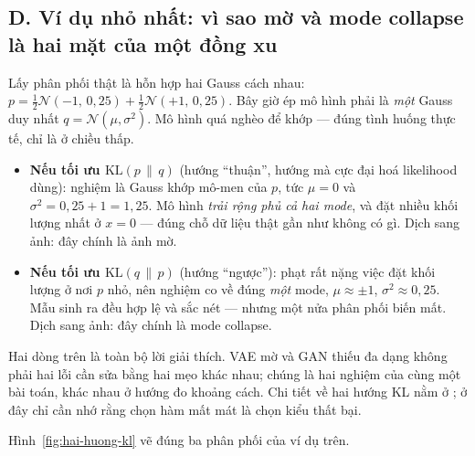 \documentclass[../../../deep_learning.tex]{subfiles}
\begin{document}
\subsection{D. Ví dụ nhỏ nhất: vì sao mờ và mode collapse là hai mặt của một đồng xu}
Lấy phân phối thật là hỗn hợp hai Gauss cách nhau: \(p = \tfrac12\mathcal{N}(-1,\,0{,}25) + \tfrac12\mathcal{N}(+1,\,0{,}25)\). Bây giờ ép mô hình phải là \emph{một} Gauss duy nhất \(q=\mathcal{N}(\mu,\sigma^{2})\). Mô hình quá nghèo để khớp --- đúng tình huống thực tế, chỉ là ở chiều thấp.

\begin{itemize}
\item \textbf{Nếu tối ưu \(\mathrm{KL}(p\,\|\,q)\)} (hướng ``thuận'', hướng mà cực đại hoá likelihood dùng): nghiệm là Gauss khớp mô-men của \(p\), tức \(\mu = 0\) và \(\sigma^{2} = 0{,}25 + 1 = 1{,}25\). Mô hình \emph{trải rộng phủ cả hai mode}, và đặt nhiều khối lượng nhất ở \(x=0\) --- đúng chỗ dữ liệu thật gần như không có gì. Dịch sang ảnh: đây chính là ảnh mờ.
\item \textbf{Nếu tối ưu \(\mathrm{KL}(q\,\|\,p)\)} (hướng ``ngược''): phạt rất nặng việc đặt khối lượng ở nơi \(p\) nhỏ, nên nghiệm co về đúng \emph{một} mode, \(\mu \approx \pm 1\), \(\sigma^{2} \approx 0{,}25\). Mẫu sinh ra đều hợp lệ và sắc nét --- nhưng một nửa phân phối biến mất. Dịch sang ảnh: đây chính là mode collapse.
\end{itemize}

Hai dòng trên là toàn bộ lời giải thích. VAE mờ và GAN thiếu đa dạng không phải hai lỗi cần sửa bằng hai mẹo khác nhau; chúng là hai nghiệm của cùng một bài toán, khác nhau ở hướng đo khoảng cách. Chi tiết về hai hướng KL nằm ở ; ở đây chỉ cần nhớ rằng chọn hàm mất mát là chọn kiểu thất bại.

Hình~\ref{fig:hai-huong-kl} vẽ đúng ba phân phối của ví dụ trên.
\end{document}
